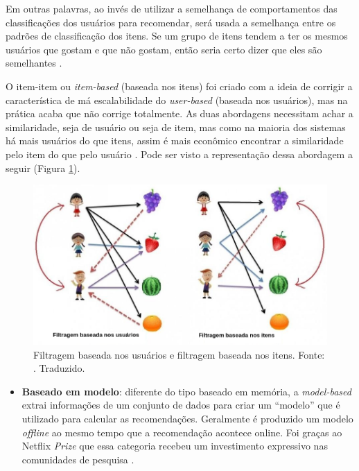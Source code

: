 Em outras palavras, ao invés de utilizar a semelhança de comportamentos das classificações dos usuários para recomendar, será usada a semelhança entre os padrões de classificação dos itens. Se um grupo de itens tendem a ter os mesmos usuários que gostam e que não gostam, então seria certo dizer que eles são semelhantes \cite{Ekstrand:2011:CFR:2185827.2185828}.

O item-item ou \textit{item-based} (baseada nos itens) foi criado com a ideia de corrigir a característica de má escalabilidade do \textit{user-based} (baseada nos usuários), mas na prática acaba que não corrige totalmente. As duas abordagens necessitam achar a similaridade, seja de usuário ou seja de item, mas como na maioria dos sistemas há mais usuários do que itens, assim é mais econômico encontrar a similaridade pelo item do que pelo usuário \cite{Ekstrand:2011:CFR:2185827.2185828}. Pode ser visto a representação dessa abordagem a seguir (Figura \ref{fig:user_based_item_based}).

\begin{figure}[H]
    \centering
    \includegraphics[scale=0.4]{figuras/referencial_teorico/user_based_item_based.png}
    \caption[Filtragem baseada nos usuários e filtragem baseada nos itens]{Filtragem baseada nos usuários e filtragem baseada nos itens. Fonte: \cite{Pinela:2017}. Traduzido.}
    \label{fig:user_based_item_based}
\end{figure}

\begin{itemize}
    \item \textbf{Baseado em modelo}: diferente do tipo baseado em memória, a \textit{model-based} extrai informações de um conjunto de dados para criar um “modelo” que é utilizado para calcular as recomendações. Geralmente é produzido um modelo \textit{offline} ao mesmo tempo que a recomendação acontece online. Foi graças ao Netflix \textit{Prize} que essa categoria recebeu um investimento expressivo nas comunidades de pesquisa \cite{Levinas2014AnAO}.
\end{itemize}

